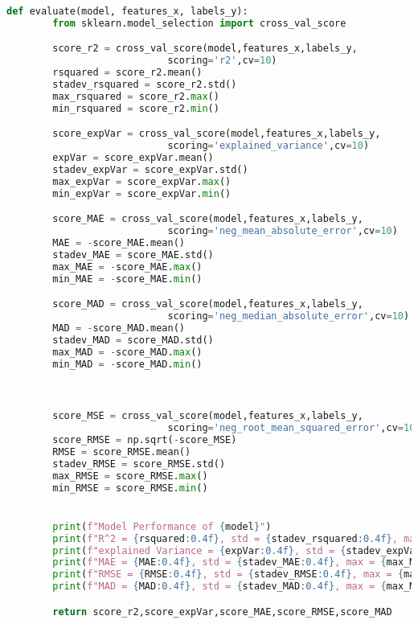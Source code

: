 \begin{lstlisting}[language=Python]
    def evaluate(model, features_x, labels_y):
        from sklearn.model_selection import cross_val_score

        score_r2 = cross_val_score(model,features_x,labels_y,
                            scoring='r2',cv=10)
        rsquared = score_r2.mean()
        stadev_rsquared = score_r2.std()
        max_rsquared = score_r2.max()
        min_rsquared = score_r2.min()

        score_expVar = cross_val_score(model,features_x,labels_y,
                            scoring='explained_variance',cv=10)
        expVar = score_expVar.mean()
        stadev_expVar = score_expVar.std()
        max_expVar = score_expVar.max()
        min_expVar = score_expVar.min()

        score_MAE = cross_val_score(model,features_x,labels_y,
                            scoring='neg_mean_absolute_error',cv=10)
        MAE = -score_MAE.mean()
        stadev_MAE = score_MAE.std()
        max_MAE = -score_MAE.max()
        min_MAE = -score_MAE.min()

        score_MAD = cross_val_score(model,features_x,labels_y,
                            scoring='neg_median_absolute_error',cv=10)
        MAD = -score_MAD.mean()
        stadev_MAD = score_MAD.std()
        max_MAD = -score_MAD.max()
        min_MAD = -score_MAD.min()



        score_MSE = cross_val_score(model,features_x,labels_y,
                            scoring='neg_root_mean_squared_error',cv=10)
        score_RMSE = np.sqrt(-score_MSE)
        RMSE = score_RMSE.mean()
        stadev_RMSE = score_RMSE.std()
        max_RMSE = score_RMSE.max()
        min_RMSE = score_RMSE.min()


        print(f"Model Performance of {model}")
        print(f"R^2 = {rsquared:0.4f}, std = {stadev_rsquared:0.4f}, max = {max_rsquared:0.4f}, min = {min_rsquared:0.4f}")
        print(f"explained Variance = {expVar:0.4f}, std = {stadev_expVar:0.4f}, max = {max_expVar:0.4f}, min = {min_expVar:0.4f}")
        print(f"MAE = {MAE:0.4f}, std = {stadev_MAE:0.4f}, max = {max_MAE:0.4f}, min = {min_MAE:0.4f}")
        print(f"RMSE = {RMSE:0.4f}, std = {stadev_RMSE:0.4f}, max = {max_RMSE:0.4f}, min = {min_RMSE:0.4f}")
        print(f"MAD = {MAD:0.4f}, std = {stadev_MAD:0.4f}, max = {max_MAD:0.4f}, min = {min_MAD:0.4f}\n")

        return score_r2,score_expVar,score_MAE,score_RMSE,score_MAD        
\end{lstlisting}

